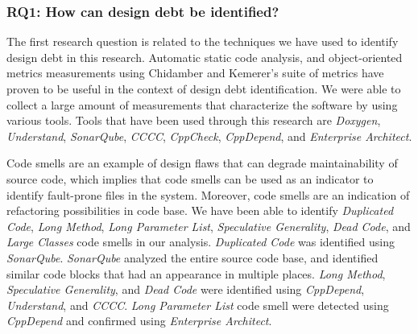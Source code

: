 







\subsubsection{RQ1: How can design debt be identified?} 
The first research question is related to the techniques we have used to identify design debt in this research. Automatic static code analysis, and object-oriented metrics measurements using Chidamber and Kemerer's suite of metrics have proven to be useful in the context of design debt identification. We were able to collect a large amount of measurements that characterize the software by using various tools. Tools that have been used through this research are \textit{Doxygen}, \textit{Understand}, \textit{SonarQube}, \textit{CCCC}, \textit{CppCheck}, \textit{CppDepend}, and \textit{Enterprise Architect}.

Code smells are an example of design flaws that can degrade maintainability of source code, which implies that code smells can be used as an indicator to identify fault-prone files in the system. Moreover, code smells are an indication of refactoring possibilities in code base. We have been able to identify \textit{Duplicated Code}, \textit{Long Method}, \textit{Long Parameter List}, \textit{Speculative Generality}, \textit{Dead Code}, and \textit{Large Classes} code smells in our analysis. \textit{Duplicated Code} was identified using \textit{SonarQube}. \textit{SonarQube} analyzed the entire source code base, and identified similar code blocks that had an appearance in multiple places. \textit{Long Method}, \textit{Speculative Generality}, and \textit{Dead Code} were identified using \textit{CppDepend}, \textit{Understand}, and \textit{CCCC}. \textit{Long Parameter List} code smell were detected using \textit{CppDepend} and confirmed using \textit{Enterprise Architect}.

